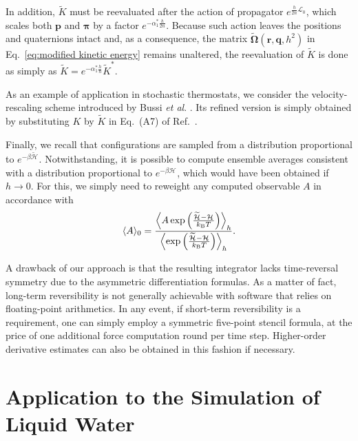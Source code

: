 \documentclass[
	aip,
	jcp,
	reprint,
]{revtex4-1}
\newcommand{\vt}[1]{\boldsymbol{\mathbf{#1}}}          %
\newcommand{\Ham}[1]{{\mathcal H}_\text{#1}}           %
\newcommand{\timestep}{h}
\newcommand{\refined}[1]{\widetilde{#1}}
\begin{document}
In addition, $\refined K$ must be reevaluated after the action of propagator $e^{\frac{\timestep}{2n} {\mathcal L}_0}$, which scales both $\vt p$ and $\vt \pi$ by a factor $e^{-\alpha_1^\ast \frac{\timestep}{2n}}$.
Because such action leaves the positions and quaternions intact and, as a consequence, the matrix $\refined{\mathbf \Omega}(\vt r, \vt q, \timestep^2)$ in Eq.~\eqref{eq:modified kinetic energy} remains unaltered, the reevaluation of $\refined K$ is done as simply as ${\refined K} = e^{-\alpha_1^\ast \frac{\timestep}{n}} {\refined K}^\ast$.

As an example of application in stochastic thermostats, we consider the  velocity-rescaling scheme introduced by Bussi \textit{et al}. \cite{Bussi_2007}.
Its refined version is simply obtained by substituting $K$ by $\refined{K}$ in Eq.~(A7) of Ref.~.

Finally, we recall that configurations are sampled from a distribution proportional to $e^{-\beta \refined{\Ham{}}}$.
Notwithstanding, it is possible to compute ensemble averages consistent with a distribution proportional to $e^{-\beta \Ham{}}$, which would have been obtained if $\timestep \to 0$.
For this, we simply need to reweight any computed observable $A$ in accordance with \cite{Torrie_1977}
\begin{equation}
\label{eq:reweighting}
\langle A \rangle_0 = \frac{\left\langle A \exp \left({\frac{\refined{\Ham{}} - \Ham{}}{k_\text{\tiny B} T}}\right)\right\rangle_\timestep}{\left\langle \exp \left({\frac{\refined{\Ham{}} - \Ham{}}{k_\text{\tiny B} T}}\right)\right\rangle_\timestep}.
\end{equation}

A drawback of our approach is that the resulting integrator lacks time-reversal symmetry due to the asymmetric differentiation formulas.
As a matter of fact, long-term reversibility is not generally achievable with software that relies on floating-point arithmetics.
In any event, if short-term reversibility is a requirement, one can simply employ a symmetric five-point stencil formula, at the price of one additional force computation round per time step.
Higher-order derivative estimates can also be obtained in this fashion if necessary.

\section{Application to the Simulation of Liquid Water}
\label{sec:numerical_results}
\end{document}

